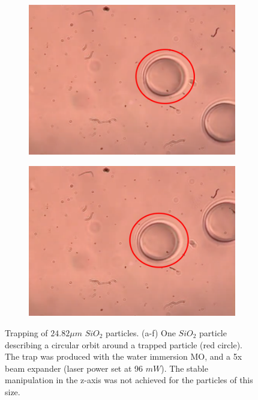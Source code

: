 \documentclass[letterpaper,12pt,oneside]{book}
\begin{document}
\begin{figure}[H]
\begin{subfigure}[b]{0.3\textwidth}
         \includegraphics[width=\textwidth]{orbitando6.png}
         \caption{}
         \label{fig:five over x}
     \end{subfigure}
     \hfill
     \begin{subfigure}[b]{0.3\textwidth}
         \centering
         \includegraphics[width=\textwidth]{orbitando7.png}
         \caption{}
         \label{fig:five over x}
     \end{subfigure}
     \caption{Trapping of $24.82 \mu m$ $SiO_{2}$ particles. (a-f) One $SiO_2$ particle describing a circular orbit around a trapped particle (red circle). The trap was produced with the water immersion MO, and a 5x beam expander (laser power set at 96 $mW$). The stable manipulation in the z-axis was not achieved for the particles of this size.}
  \label{fig2d} 
\end{figure} %
\end{document}
